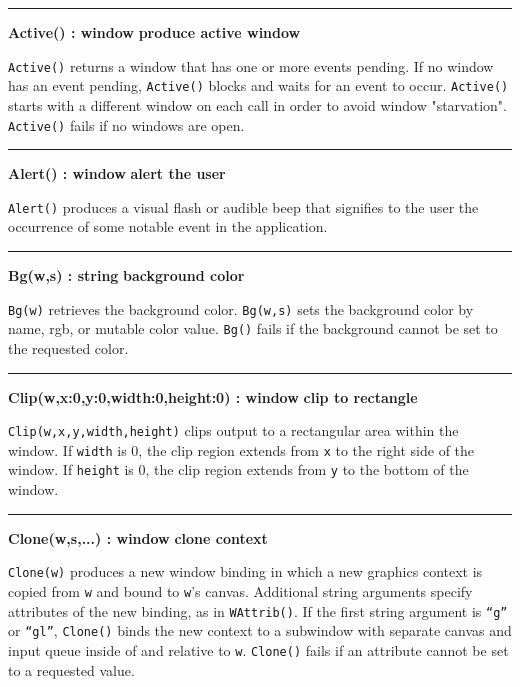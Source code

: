 \bigskip\hrule\vspace{0.1cm}
\noindent
{\bf Active() : window } \hfill {\bf produce active window}

\noindent
\texttt{Active()} returns a window that has one or more events pending.
If no window has an event pending, \texttt{Active()} blocks and waits
for an event to occur. \texttt{Active()} starts with a different
window on each call in order to avoid window
"starvation". \texttt{Active()} fails if
no windows are open.

\bigskip\hrule\vspace{0.1cm}
\noindent
{\bf Alert() : window } \hfill {\bf alert the user}

\noindent
\texttt{Alert()} produces a visual flash or audible beep that signifies
to the user the occurrence of some notable event in the application.

\bigskip\hrule\vspace{0.1cm}
\noindent
{\bf Bg(w,s) : string } \hfill {\bf background color}

\noindent
\texttt{Bg(w)} retrieves the background color. \texttt{Bg(w,s)} sets the
background color by name, rgb, or mutable color value. \texttt{Bg()}
fails if the background cannot be set to the requested color.

\bigskip\hrule\vspace{0.1cm}
\noindent
{\bf Clip(w,x:0,y:0,width:0,height:0) : window } \hfill {\bf clip to rectangle}

\noindent
\texttt{Clip(w,x,y,width,height)} clips output to a rectangular area
within the window. If \texttt{width} is 0, the clip region extends
from \texttt{x} to the right side of the window. If \texttt{height}
is 0, the clip region extends from \texttt{y} to the bottom of the
window.

\bigskip\hrule\vspace{0.1cm}
\noindent
{\bf Clone(w,s,...) : window } \hfill {\bf clone context}

\noindent
\texttt{Clone(w)} produces a new window binding in which a new graphics
context is copied from \texttt{w} and bound to
\texttt{w}'s canvas. Additional string arguments
specify attributes of the new binding, as in \texttt{WAttrib()}. If the
first string argument is
\texttt{{\textquotedblleft}g{\textquotedblright}} or
\texttt{{\textquotedblleft}gl{\textquotedblright}}, \texttt{Clone()}
binds the new context to a subwindow with separate canvas and input
queue inside of and relative to \texttt{w}. \texttt{Clone()} fails if
an attribute cannot be set to a requested value.

